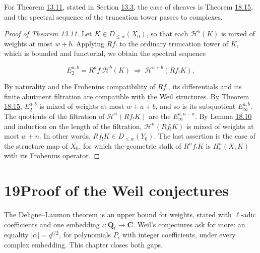 \documentclass[11pt]{article}
\begin{document}
\label{bp317}%
For Theorem \hyperref[bp38]{13.11}, stated in Section \hyperref[bp36]{13.3}, the case of sheaves is Theorem \hyperref[bp315]{18.15}, and the spectral sequence of the truncation tower passes to complexes.

\begin{proof}[{Proof of Theorem 13.11}]\label{bp318}%
Let \(K\in D_{\le w}(X_0)\), so that each \(\mathcal H^b(K)\) is mixed of weights at most \(w+b\). Applying \(Rf_!\) to the ordinary truncation tower of \(K\), which is bounded and functorial, we obtain the spectral sequence

\[
E_2^{a,b}=R^af_!\mathcal H^b(K)
\ \Longrightarrow\ \mathcal H^{a+b}(Rf_!K),
\]

By naturality and the Frobenius compatibility of \(Rf_!\), its differentials and its finite abutment filtration are compatible with the Weil structures. By Theorem \hyperref[bp315]{18.15}, \(E_2^{a,b}\) is mixed of weights at most \(w+a+b\), and so is its subquotient \(E_\infty^{a,b}\). The quotients of the filtration of \(\mathcal H^n(Rf_!K)\) are the \(E_\infty^{a,n-a}\). By Lemma \hyperref[bp303]{18.10} and induction on the length of the filtration, \(\mathcal H^n(Rf_!K)\) is mixed of weights at most \(w+n\). In other words, \(Rf_!K\in D_{\le w}(Y_0)\). The last assertion is the case of the structure map of \(X_0\), for which the geometric stalk of \(R^nf_!K\) is \(H_c^n(X,K)\) with its Frobenius operator.
\end{proof}



\section*{\texorpdfstring{19\quad Proof of the Weil conjectures}{19 Proof of the Weil conjectures}}
\label{bp319}%
\label{bp320}%
The Deligne–Laumon theorem is an upper bound for weights, stated with \(\ell\)-adic coefficients and one embedding \(\iota:\overline{\mathbf Q}_\ell\to\mathbf C\). Weil's conjectures ask for more: an equality \(|\alpha|=q^{i/2}\), for polynomials \(P_i\) with integer coefficients, under every complex embedding. This chapter closes both gaps.
\end{document}
